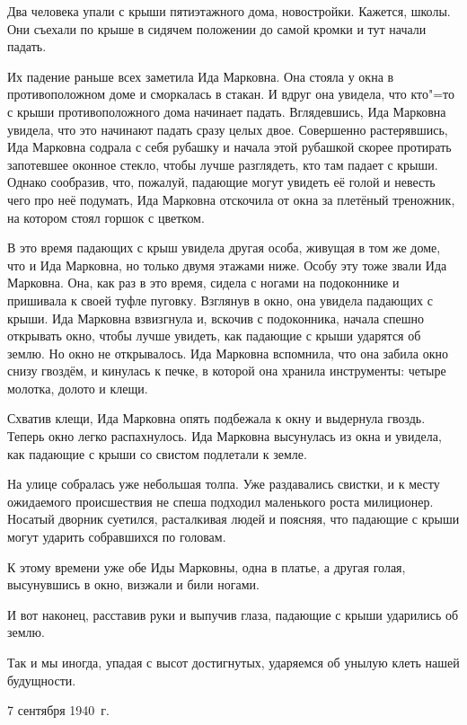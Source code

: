 Два человека упали с крыши пятиэтажного дома, новостройки. Кажется, школы. Они съехали по крыше в сидячем положении до самой кромки и тут начали падать.

Их падение раньше всех заметила Ида Марковна. Она стояла у окна в противоположном доме и сморкалась в стакан. И вдруг она увидела, что кто"=то с крыши противоположного дома начинает падать. Вглядевшись, Ида Марковна увидела, что это начинают падать сразу целых двое. Совершенно растерявшись, Ида Марковна содрала с себя рубашку и начала этой рубашкой скорее протирать запотевшее оконное стекло, чтобы лучше разглядеть, кто там падает с крыши. Однако сообразив, что, пожалуй, падающие могут увидеть её голой и невесть чего про неё подумать, Ида Марковна отскочила от окна за плетёный треножник, на котором стоял горшок с цветком.

В это время падающих с крыш увидела другая особа, живущая в том же доме, что и Ида Марковна, но только двумя этажами ниже. Особу эту тоже звали Ида Марковна. Она, как раз в это время, сидела с ногами на подоконнике и пришивала к своей туфле пуговку. Взглянув в окно, она увидела падающих с крыши. Ида Марковна взвизгнула и, вскочив с подоконника, начала спешно открывать окно, чтобы лучше увидеть, как падающие с крыши ударятся об землю. Но окно не открывалось. Ида Марковна вспомнила, что она забила окно снизу гвоздём, и кинулась к печке, в которой она хранила инструменты: четыре молотка, долото и клещи.

Схватив клещи, Ида Марковна опять подбежала к окну и выдернула гвоздь. Теперь окно легко распахнулось. Ида Марковна высунулась из окна и увидела, как падающие с крыши со свистом подлетали к земле.

На улице собралась уже небольшая толпа. Уже раздавались свистки, и к месту ожидаемого происшествия не спеша подходил маленького роста милиционер. Носатый дворник суетился, расталкивая людей и поясняя, что падающие с крыши могут ударить собравшихся по головам.

К этому времени уже обе Иды Марковны, одна в платье, а другая голая, высунувшись в окно, визжали и били ногами.

И вот наконец, расставив руки и выпучив глаза, падающие с крыши ударились об землю.

Так и мы иногда, упадая с высот достигнутых, ударяемся об унылую клеть нашей будущности.

\begin{flushright}
7 сентября 1940~г.
\end{flushright}
